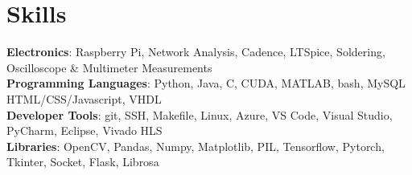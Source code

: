 \documentclass[letterpaper,11pt]{article}
\begin{document}
% 
\section{Skills}
 \begin{itemize}[leftmargin=0.15in, label={}]
    \small{\item{
    \textbf{Electronics}{: Raspberry Pi, Network Analysis, Cadence, LTSpice, Soldering, Oscilloscope \& Multimeter Measurements} \\
     \textbf{Programming Languages}{:  Python, Java, C, CUDA, MATLAB, bash, MySQL HTML/CSS/Javascript, VHDL} \\
     \textbf{Developer Tools}{: git, SSH, Makefile, Linux, Azure, VS Code, Visual Studio, PyCharm, Eclipse, Vivado HLS} \\
     \textbf{Libraries}{: OpenCV, Pandas, Numpy, Matplotlib, PIL, Tensorflow, Pytorch, Tkinter, Socket, Flask, Librosa} \\
    }}
 \end{itemize}


\end{document}
